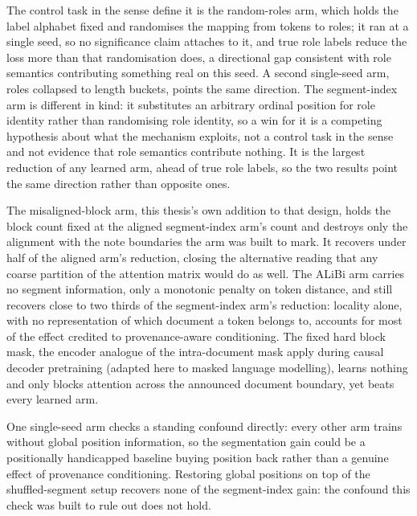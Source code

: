 The control task in the
sense \citet{hewitt2019control} define it is the random-roles arm, which holds
the label alphabet fixed and randomises the mapping from tokens to roles; it
ran at a single seed, so no significance claim attaches to it, and true role
labels reduce the loss more than that randomisation does, a directional gap
consistent with role semantics contributing something real on this seed. A
second single-seed arm, roles collapsed to length buckets, points the same
direction. The segment-index arm is different in kind: it substitutes an
arbitrary ordinal position for role identity rather than randomising role
identity, so a win for it is a competing hypothesis about what the mechanism
exploits, not a control task in the \citet{hewitt2019control} sense and not
evidence that role semantics contribute nothing. It is the largest
reduction of any learned arm, ahead of true role labels, so the two results
point the same direction rather than opposite ones.

The misaligned-block arm, this thesis's own addition to that design, holds the
block count fixed at the aligned segment-index arm's count and destroys only
the alignment with the note boundaries the arm was built to mark. It recovers
under half of the aligned arm's reduction, closing the alternative reading
that any coarse partition of the attention matrix would do as well. The ALiBi
arm carries no segment information, only a monotonic penalty on
token distance, and still recovers close to two thirds of the segment-index
arm's reduction: locality alone, with no representation of which document a
token belongs to, accounts for most of the effect credited to
provenance-aware conditioning. The fixed hard block mask, the encoder analogue
of the intra-document mask \citet{zhao2024seqcomposition} apply during causal
decoder pretraining (adapted here to masked language modelling), learns
nothing and only blocks attention across the announced document boundary, yet
beats every learned arm.

One single-seed arm checks a standing confound directly: every other arm
trains without global position information, so the segmentation gain could
be a positionally handicapped baseline buying position back rather
than a genuine effect of provenance conditioning. Restoring global positions
on top of the shuffled-segment setup recovers none of the segment-index gain:
the confound this check was built to rule out does not hold.

